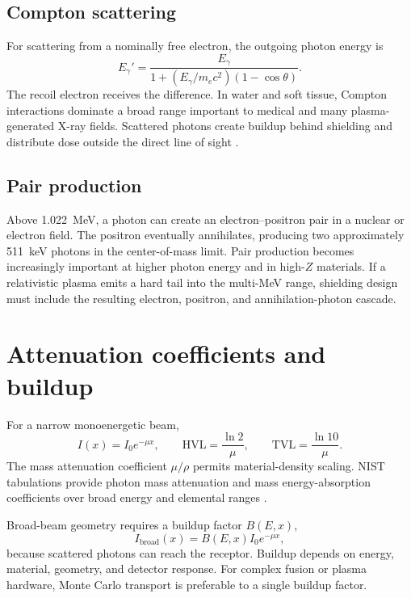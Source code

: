 \subsection{Compton scattering}

For scattering from a nominally free electron, the outgoing photon energy is
\begin{equation}
E_\gamma'=
\frac{E_\gamma}{1+(E_\gamma/m_ec^2)(1-\cos\theta)}.
\label{eq:compton}
\end{equation}
The recoil electron receives the difference. In water and soft tissue, Compton interactions dominate a broad range important to medical and many plasma-generated X-ray fields. Scattered photons create buildup behind shielding and distribute dose outside the direct line of sight \cite{attix1986,turner2007,baatout2023}.

\subsection{Pair production}

Above \SI{1.022}{\MeV}, a photon can create an electron--positron pair in a nuclear or electron field. The positron eventually annihilates, producing two approximately \SI{511}{\keV} photons in the center-of-mass limit. Pair production becomes increasingly important at higher photon energy and in high-$Z$ materials. If a relativistic plasma emits a hard tail into the multi-MeV range, shielding design must include the resulting electron, positron, and annihilation-photon cascade.

\section{Attenuation coefficients and buildup}

For a narrow monoenergetic beam,
\begin{equation}
I(x)=I_0e^{-\mu x},
\qquad
\mathrm{HVL}=\frac{\ln2}{\mu},
\qquad
\mathrm{TVL}=\frac{\ln10}{\mu}.
\label{eq:attenuation}
\end{equation}
The mass attenuation coefficient $\mu/\rho$ permits material-density scaling. NIST tabulations provide photon mass attenuation and mass energy-absorption coefficients over broad energy and elemental ranges \cite{hubbell2004}.

Broad-beam geometry requires a buildup factor $B(E,x)$,
\begin{equation}
I_{\mathrm{broad}}(x)=B(E,x)I_0e^{-\mu x},
\label{eq:buildup}
\end{equation}
because scattered photons can reach the receptor. Buildup depends on energy, material, geometry, and detector response. For complex fusion or plasma hardware, Monte Carlo transport is preferable to a single buildup factor.

